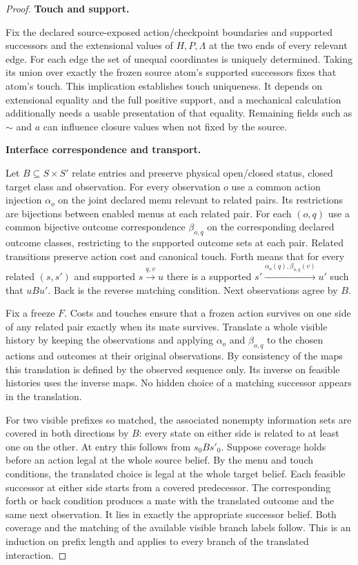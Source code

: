 \begin{proof}

\textbf{Touch and support.}

Fix the declared source-exposed action/checkpoint boundaries and supported successors and the extensional values of \(H,P,\Lambda\) at the two ends of every relevant edge. For each edge the set of unequal coordinates is uniquely determined. Taking its union over exactly the frozen source atom's supported successors fixes that atom's touch. This implication establishes touch uniqueness. It depends on extensional equality and the full positive support, and a mechanical calculation additionally needs a usable presentation of that equality. Remaining fields such as \(\sim\) and \(a\) can influence closure values when not fixed by the source.

\textbf{Interface correspondence and transport.}

Let \(B\subseteq S\times S'\) relate entries and preserve physical open/closed status, closed target class and observation. For every observation \(o\) use a common action injection \(\alpha_o\) on the joint declared menu relevant to related pairs. Its restrictions are bijections between enabled menus at each related pair. For each \((o,q)\) use a common bijective outcome correspondence \(\beta_{o,q}\) on the corresponding declared outcome classes, restricting to the supported outcome sets at each pair. Related transitions preserve action cost and canonical touch. Forth means that for every related \((s,s')\) and supported \(s\xrightarrow{q,v}u\) there is a supported \(s'\xrightarrow{\alpha_o(q),\beta_{o,q}(v)}u'\) such that \(u B u'\). Back is the reverse matching condition. Next observations agree by \(B\).

Fix a freeze \(F\). Costs and touches ensure that a frozen action survives on one side of any related pair exactly when its mate survives. Translate a whole visible history by keeping the observations and applying \(\alpha_o\) and \(\beta_{o,q}\) to the chosen actions and outcomes at their original observations. By consistency of the maps this translation is defined by the observed sequence only. Its inverse on feasible histories uses the inverse maps. No hidden choice of a matching successor appears in the translation.

For two visible prefixes so matched, the associated nonempty information sets are covered in both directions by \(B\): every state on either side is related to at least one on the other. At entry this follows from \(s_0 B s'_0\). Suppose coverage holds before an action legal at the whole source belief. By the menu and touch conditions, the translated choice is legal at the whole target belief. Each feasible successor at either side starts from a covered predecessor. The corresponding forth or back condition produces a mate with the translated outcome and the same next observation. It lies in exactly the appropriate successor belief. Both coverage and the matching of the available visible branch labels follow. This is an induction on prefix length and applies to every branch of the translated interaction.


\end{proof}
